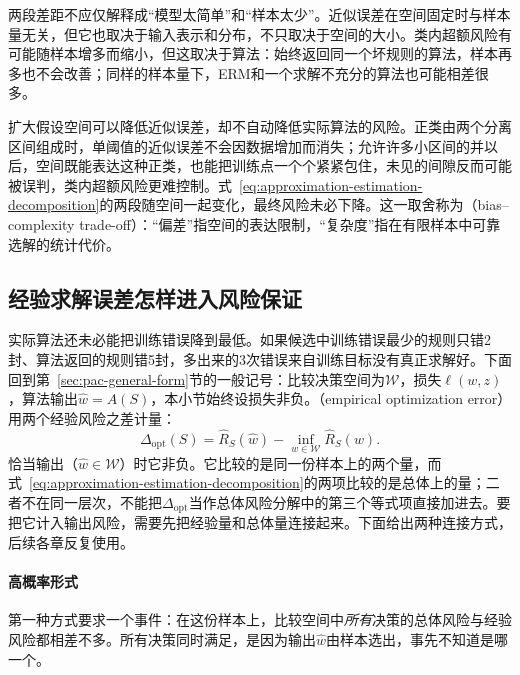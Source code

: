 两段差距不应仅解释成“模型太简单”和“样本太少”。近似误差在空间固定时与样本量无关，但它也取决于输入表示和分布，不只取决于空间的大小。类内超额风险有可能随样本增多而缩小，但这取决于算法：始终返回同一个坏规则的算法，样本再多也不会改善；同样的样本量下，ERM和一个求解不充分的算法也可能相差很多。

扩大假设空间可以降低近似误差，却不自动降低实际算法的风险。正类由两个分离区间组成时，单阈值的近似误差不会因数据增加而消失；允许许多小区间的并以后，空间既能表达这种正类，也能把训练点一个个紧紧包住，未见的间隙反而可能被误判，类内超额风险更难控制。式~\eqref{eq:approximation-estimation-decomposition}的两段随空间一起变化，最终风险未必下降。这一取舍称为（bias--complexity trade-off）：“偏差”指空间的表达限制，“复杂度”指在有限样本中可靠选解的统计代价。

\subsection{经验求解误差怎样进入风险保证}
\label{sec:risk-comparison}

实际算法还未必能把训练错误降到最低。如果候选中训练错误最少的规则只错2封、算法返回的规则错5封，多出来的3次错误来自训练目标没有真正求解好。下面回到第~\ref{sec:pac-general-form}节的一般记号：比较决策空间为$\mathcal W$，损失$\ell(w,z)$，算法输出$\hat w=A(S)$，本小节始终设损失非负。（empirical optimization error）用两个经验风险之差计量：
\begin{equation}
  \Delta_{\mathrm{opt}}(S)
  =\hat R_S(\hat w)-\inf_{w\in\mathcal W}\hat R_S(w).
  \label{eq:empirical-optimization-error}
\end{equation}
恰当输出（$\hat w\in\mathcal W$）时它非负。它比较的是同一份样本上的两个量，而式~\eqref{eq:approximation-estimation-decomposition}的两项比较的是总体上的量；二者不在同一层次，不能把$\Delta_{\mathrm{opt}}$当作总体风险分解中的第三个等式项直接加进去。要把它计入输出风险，需要先把经验量和总体量连接起来。下面给出两种连接方式，后续各章反复使用。

\paragraph{高概率形式}
第一种方式要求一个事件：在这份样本上，比较空间中\emph{所有}决策的总体风险与经验风险都相差不多。所有决策同时满足，是因为输出$\hat w$由样本选出，事先不知道是哪一个。

